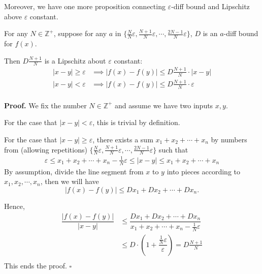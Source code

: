 	
	Moreover, we have one more proposition connecting $\varepsilon$-diff bound and Lipschitz above $\varepsilon$ constant.
	
	
	\begin{proposition}
		For any $N\in\mathbb{Z}^+$, suppose for any $a$ in $\{\frac{N}{N}\varepsilon,\frac{N+1}{N}\varepsilon,\cdots, \frac{2N-1}{N}\varepsilon\}$, $D$ is an $a$-diff bound for $f(x)$. 
		
		Then $D\frac{N+1}{N}$ is a Lipschitz about $\varepsilon$ constant:\begin{align*}
			|x-y|\geq \varepsilon &\implies |f(x)-f(y)| \leq D\frac{N+1}{N} \cdot |x-y|\\
			|x-y|<\varepsilon &\implies |f(x)-f(y)| \leq D\frac{N+1}{N} \cdot \varepsilon\\
		\end{align*}
	\end{proposition}
	
	\textbf{Proof.}
	We fix the number $N\in\mathbb{Z}^+$ and assume we have two inputs $x, y$.
	
	For the case that $|x-y|<\varepsilon$, this is trivial by definition.
	
	For the case that $|x-y|\geq \varepsilon$, there exists a sum $x_1+x_2+\cdots+x_n$ by numbers from (allowing repetitions) $\{\frac{N}{N}\varepsilon,\frac{N+1}{N}\varepsilon,\cdots, \frac{2N-1}{N}\varepsilon\}$ such that \begin{align*}
		\varepsilon \leq x_1+x_2+\cdots+x_n -\frac{1}{N}\varepsilon \leq |x-y| \leq x_1+x_2+\cdots+x_n
	\end{align*}
	By assumption, divide the line segment from $x$ to $y$ into pieces according to $x_1, x_2,\cdots,x_n$, then we will have $$|f(x)-f(y)|\leq Dx_1+Dx_2+\cdots+Dx_n.$$
	
	Hence,\begin{align*}
		\dfrac{|f(x)-f(y)|}{|x-y|} &\leq \dfrac{Dx_1+Dx_2+\cdots+Dx_n}{x_1+x_2+\cdots+x_n -\frac{1}{N}\varepsilon}\\
		& \leq D\cdot( 1+  \dfrac{\frac{1}{N}\varepsilon}{\varepsilon})= D \frac{N+1}{N}\\
	\end{align*}
	This ends the proof.
	\hfill $\square$
	
	\fi

	
	
